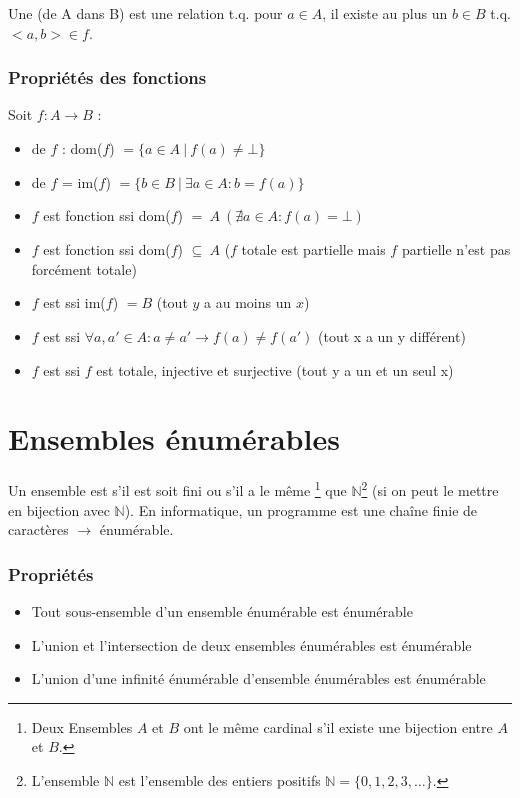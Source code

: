 Une  (de A dans B) est une relation t.q. pour $a \in A$, il existe au plus un $b \in B$ t.q. $<a, b> \in f$.

\subsubsection{Propriétés des fonctions}

Soit $f : A \rightarrow B$ :
\begin{itemize}
\item {} de $f$ : dom($f$) $= \{a \in A \ | \ f(a) \neq \bot\}$
\item {} de $f$ = im($f$) $= \{b \in B \ | \ \exists a \in A : b = f(a)\}$
\item $f$ est fonction  ssi dom($f$) $= \ A \ (\nexists a \in A : f(a) = \bot)$ 
\item $f$ est fonction  ssi dom($f$) $\subseteq \ A$ ($f$ totale est partielle mais $f$ partielle n'est pas forcément totale)
\item $f$ est  ssi im($f$) $= B$ (tout $y$ a au moins un $x$)
\item $f$ est  ssi $\forall a, a' \in A : a \neq a' \rightarrow f(a) \neq f(a')$ (tout x a un y différent)
\item $f$ est  ssi $f$ est totale, injective et surjective (tout y a un et un seul x)
\end{itemize}

\section{Ensembles énumérables}

Un ensemble est  s'il est soit fini ou s'il a le même \footnote{Deux Ensembles $A$ et $B$ ont le même cardinal s'il existe une bijection entre $A$ et $B$.} que $\mathbb{N}$\footnote{L'ensemble $\mathbb{N}$ est l'ensemble des entiers positifs $\mathbb{N} = \{0, 1, 2, 3, \ldots\}$.} (si on peut le mettre en bijection avec $\mathbb{N}$). En informatique, un programme est une chaîne finie de caractères $\rightarrow$ énumérable.

\subsubsection{Propriétés}

\begin{itemize}
\item Tout sous-ensemble d'un ensemble énumérable est énumérable
\item L'union et l'intersection de deux ensembles énumérables est énumérable
\item L'union d'une infinité énumérable d'ensemble énumérables est énumérable
\end{itemize}

